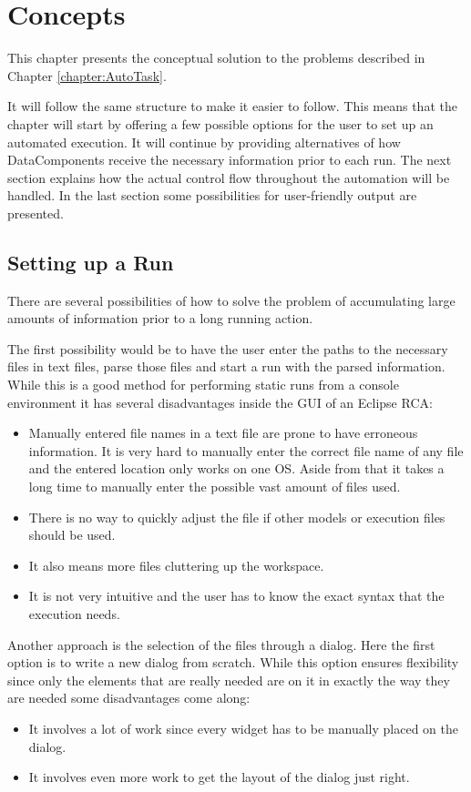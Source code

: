 \chapter{Concepts}
\label{section:AutoConcepts}
This chapter presents the conceptual solution to the problems described in Chapter \ref{chapter:AutoTask}.

It will follow the same structure to make it easier to follow. This means that the chapter will start
by offering a few possible options for the user to set up an automated execution. It will continue
by providing alternatives of how DataComponents receive the necessary information prior to each run.
The next section explains how the actual control flow throughout the automation will be handled.
In the last section some possibilities for user-friendly output are presented.

\section{Setting up a Run}
\label{section:AutoConceptsSetup}
There are several possibilities of how to solve the problem of accumulating
large amounts of information prior to a long running action.

The first possibility would be to have the user enter the paths to the 
necessary files in text files, parse those files and start a run with
the parsed information. While this is a good method for performing
static runs from a console environment it has several disadvantages
inside the \ac{GUI} of an Eclipse \ac{RCA}:
\begin{itemize}
 \item Manually entered file names in a text file are prone to have erroneous information.
It is very hard to manually enter the correct file name of any file and the entered location
only works on one \ac{OS}. Aside from that it takes a long time to manually enter the possible vast
amount of files used.
 \item There is no way to quickly adjust the file if other models or execution files should be used.
 \item It also means more files cluttering up the workspace.
 \item It is not very intuitive and the user has to know the exact syntax that the execution needs.
\end{itemize}

Another approach is the selection of the files through a dialog.
Here the first option is to write a new dialog from scratch. While this option
ensures flexibility since only the elements that are really needed are on it in
exactly the way they are needed some disadvantages come along:
\begin{itemize}
 \item It involves a lot of work since every widget has to be manually placed on the dialog.
 \item It involves even more work to get the layout of the dialog just right.
\end{itemize}

